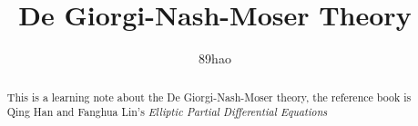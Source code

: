\documentclass[a4paper]{article}
\begin{document}
\title{De Giorgi-Nash-Moser Theory}
\author{89hao}
\maketitle
\begin{abstract}
  {This is a learning note about the De Giorgi-Nash-Moser theory, the reference book is Qing Han and Fanghua Lin's {\itshape Elliptic Partial Differential Equations}}
\end{abstract}


%
%
\end{document}
